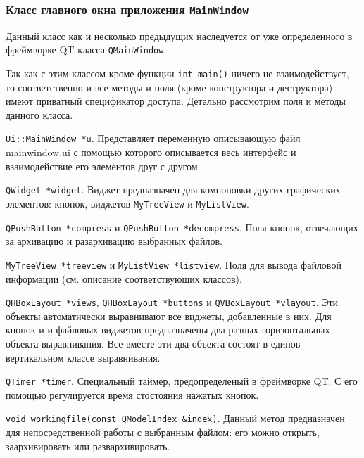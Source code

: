 \subsubsection{Класс главного окна приложения \texttt{MainWindow}}

Данный класс как и несколько предыдущих наследуется от уже определенного в фреймворке QT класса \texttt{QMainWindow}.



Так как с этим классом кроме функции \texttt{int main()} ничего не взаимодействует, то соответственно и все методы и поля (кроме конструктора и деструктора) имеют приватный спецификатор доступа.
Детально рассмотрим поля и методы данного класса.



\texttt{Ui::MainWindow *u}.
Представляет переменную описывающую файл mainwindow.ui с помощью которого описывается весь интерфейс и взаимодействие его элементов друг с другом.



\texttt{QWidget *widget}.
Виджет предназначен для компоновки других графических элементов: кнопок, виджетов \texttt{MyTreeView} и \texttt{MyListView}.



\texttt{QPushButton *compress} и \texttt{QPushButton *decompress}.
Поля кнопок, отвечающих за архивацию и разархивацию выбранных файлов.



\texttt{MyTreeView *treeview} и \texttt{MyListView *listview}.
Поля для вывода файловой информации (см. описание соответствующих классов).



\texttt{QHBoxLayout *views}, \texttt{QHBoxLayout *buttons} и \texttt{QVBoxLayout *vlayout}.
Эти объекты автоматически выравнивают все виджеты, добавленные в них. 
Для кнопок и и файловых виджетов предназначены два разных горизонтальных объекта выравнивания.
Все вместе эти два объекта состоят в единов вертикальном классе выравнивания.



\texttt{QTimer *timer}.
Специальный таймер, предопределеный в фреймворке QT.  
С его помощью регулируется время стостояния нажатых кнопок.



\texttt{void working{\textunderscore}file(const QModelIndex \&index)}.
Данный метод предназначен для непосредственной работы с выбранным файлом: его можно открыть, заархивировать или развархивировать.



